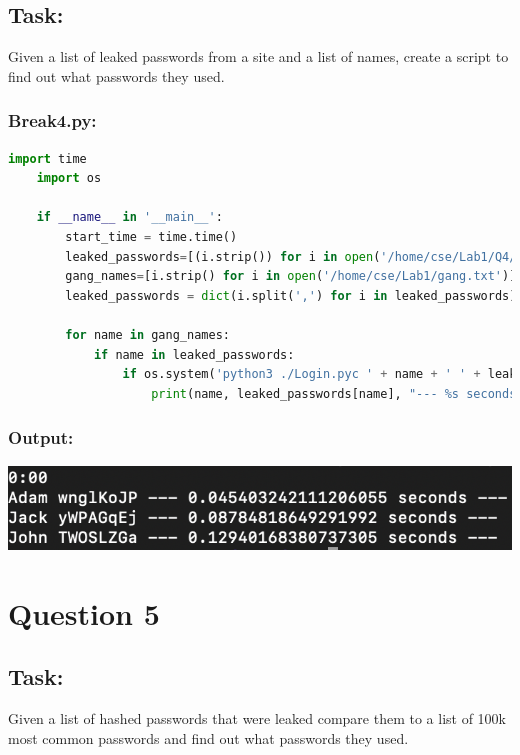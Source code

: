 \documentclass{article}
\begin{document}
\subsection*{Task:}
Given a list of leaked passwords from a site and a list of names, create a script to
find out what passwords they used.

\subsubsection*{Break4.py:}
\begin{lstlisting}[language=Python]
    import time
    import os

    if __name__ in '__main__':
        start_time = time.time()
        leaked_passwords=[(i.strip()) for i in open('/home/cse/Lab1/Q4/PwnedPWfile')]
        gang_names=[i.strip() for i in open('/home/cse/Lab1/gang.txt')]
        leaked_passwords = dict(i.split(',') for i in leaked_passwords)

        for name in gang_names:
            if name in leaked_passwords:
                if os.system('python3 ./Login.pyc ' + name + ' ' + leaked_passwords[name] + " >/dev/null 2>&1") == 0:
                    print(name, leaked_passwords[name], "--- %s seconds ---" % (time.time() - start_time))
\end{lstlisting}

\subsubsection*{Output:}
\begin{center}
    \includegraphics[scale=.5]{images/Q4_Output.png}
\end{center}

\section{Question 5}
\subsection*{Task:}
Given a list of hashed passwords that were leaked compare them to a list of 100k most common passwords and find out what passwords they used.
\end{document}
